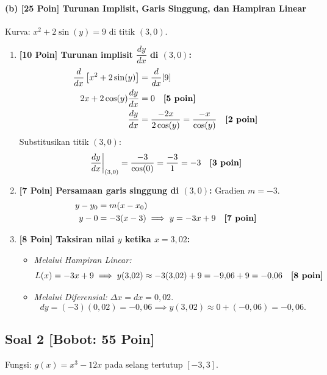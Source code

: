 \documentclass[11pt,a4paper]{article}
\begin{document}
\paragraph{(b) [25 Poin] Turunan Implisit, Garis Singgung, dan Hampiran Linear}
Kurva: $x^2 + 2\sin(y) = 9$ di titik $(3, 0)$.
\begin{enumerate}[label=(\roman*), leftmargin=18pt]
    \item \textbf{[10 Poin] Turunan implisit $\dfrac{dy}{dx}$ di $(3, 0)$:}
    \begin{align*}
        \frac{d}{dx}\left[ x^2 + 2\sin(y) \right] &= \frac{d}{dx}[9] \\
        2x + 2\cos(y)\frac{dy}{dx} &= 0 \quad \text{\textbf{[5 poin]}} \\
        \frac{dy}{dx} &= \frac{-2x}{2\cos(y)} = \frac{-x}{\cos(y)} \quad \text{\textbf{[2 poin]}}
    \end{align*}
    Substitusikan titik $(3, 0)$:
    \[
    \left.\frac{dy}{dx}\right|_{(3, 0)} = \frac{-3}{\cos(0)} = \frac{-3}{1} = -3 \quad \text{\textbf{[3 poin]}}
    \]

    \item \textbf{[7 Poin] Persamaan garis singgung di $(3, 0)$:}
    Gradien $m = -3$.
    \begin{align*}
        y - y_0 &= m(x - x_0) \\
        y - 0 &= -3(x - 3) \implies y = -3x + 9 \quad \text{\textbf{[7 poin]}}
    \end{align*}

    \item \textbf{[8 Poin] Taksiran nilai $y$ ketika $x = 3{,}02$:}
    \begin{itemize}
        \item \textit{Melalui Hampiran Linear:}
        \[
        L(x) = -3x + 9 \implies y(3{,}02) \approx -3(3{,}02) + 9 = -9{,}06 + 9 = -0{,}06 \quad \text{\textbf{[8 poin]}}
        \]
        \item \textit{Melalui Diferensial:}
        $\Delta x = dx = 0{,}02$.
        \[
        dy = (-3)(0{,}02) = -0{,}06 \implies y(3{,}02) \approx 0 + (-0{,}06) = -0{,}06.
        \]
    \end{itemize}
\end{enumerate}

\vspace{10pt}
\subsection*{Soal 2 [Bobot: 55 Poin]}
Fungsi: $g(x) = x^3 - 12x$ pada selang tertutup $[-3, 3]$.
\end{document}
